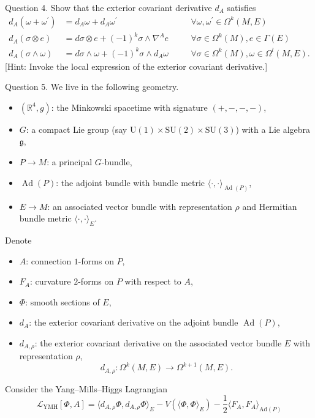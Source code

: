 \qquad Question 4. Show that the exterior covariant derivative $d_A$ satisfies
\begin{align*}
d_A(\omega+\omega^{\prime}) & =d_A \omega+d_A \omega^{\prime} & \quad & \forall \omega, \omega^{\prime} \in \Omega^k(M, E) \\
d_A(\sigma \otimes e) & =d \sigma \otimes e+(-1)^k \sigma \wedge \nabla^A e & \quad & \forall \sigma \in \Omega^k(M), e \in \Gamma(E) \\
d_A(\sigma \wedge \omega) & =d \sigma \wedge \omega+(-1)^k \sigma \wedge d_A \omega & \quad & \forall \sigma \in \Omega^k(M), \omega \in \Omega^l(M, E) .
\end{align*}
[Hint: Invoke the local expression of the exterior covariant derivative.]

\qquad Question 5. We live in the following geometry.
\begin{itemize}
\item $(\mathbb{R}^4, g)$: the Minkowski spacetime with signature $(+,-,-,-)$,
\item $G$: a compact Lie group (say $\mathrm{U}(1) \times \mathrm{SU}(2) \times \mathrm{SU}(3)$) with a Lie algebra $\mathfrak{g}$,
\item $P \rightarrow M$: a principal $G$-bundle,
\item $\operatorname{Ad}(P)$: the adjoint bundle with bundle metric $\langle\cdot, \cdot\rangle_{\operatorname{Ad}(P)}$,
\item $E \rightarrow M$: an associated vector bundle with representation $\rho$ and Hermitian bundle metric $\langle\cdot, \cdot\rangle_E$.
\end{itemize}
Denote
\begin{itemize}
\item $A$: connection $1$-forms on $P$,
\item $F_A$: curvature $2$-forms on $P$ with respect to $A$,
\item $\Phi$: smooth sections of $E$,
\item $d_A$: the exterior covariant derivative on the adjoint bundle $\operatorname{Ad}(P)$,
\item $d_{A, \rho}$: the exterior covariant derivative on the associated vector bundle $E$ with representation $\rho$,
\[d_{A, \rho}: \Omega^k(M, E) \longrightarrow \Omega^{k+1}(M, E).\]
\end{itemize}
Consider the Yang--Mills--Higgs Lagrangian
\[\mathscr{L}_{\mathrm{YMH}}[\Phi, A]=\langle d_{A, \rho}\Phi, d_{A, \rho}\Phi \rangle_E
-V(\langle\Phi, \Phi\rangle_E)-\frac{1}{2}\langle F_A, F_A\rangle_{\mathrm{Ad}(P)}\]
